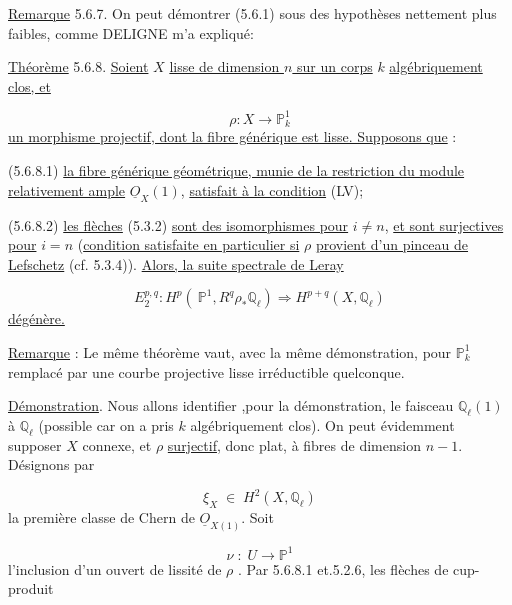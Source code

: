 \underline{Remarque} 5.6.7. On peut démontrer (5.6.1) sous des hypothèses nettement plus faibles, comme DELIGNE m'a expliqué:

\underline{Théorème} 5.6.8. \underline{Soient} $X$ \underline{lisse de dimension $n$ sur un corps} $k$ \underline{algébriquement clos, et}

\begin{equation*}
\rho : X \longrightarrow \mathbb{P}^1_k
\end{equation*}
\underline{un morphisme projectif, dont la fibre générique est lisse. Supposons que} :

(5.6.8.1) \underline{la fibre générique géométrique, munie de la restriction du module relativement ample} $\underline{O}_X(1)$, \underline{satisfait à la condition} (LV);

(5.6.8.2) \underline{les flèches} (5.3.2) \underline{sont des isomorphismes pour} $i \neq n$, \underline{et sont surjectives pour} $i = n$ (\underline{condition satisfaite en particulier si} $\rho$ \underline{provient d'un pinceau de Lefschetz} (cf. 5.3.4)). \underline{Alors, la suite spectrale de Leray}

\begin{equation*}
E_2^{p,q} : H^p(\ \mathbb{P}^1,R^q\rho_*\mathbb{Q}_{\ell}) \Longrightarrow H^{p+q}(X,\mathbb{Q}_{\ell})
\end{equation*}
\underline{dégénère.}

\underline{Remarque} : Le même théorème vaut, avec la même démonstration, pour $\mathbb{P}^1_k$ remplacé par une courbe projective lisse irréductible quelconque.



\underline{Démonstration}. Nous allons identifier ,pour la démonstration, le faisceau $\mathbb{Q}_\ell(1)$ à $\mathbb{Q}_\ell$ (possible car on a pris $k$ algébriquement clos). On peut évidemment supposer $X$ connexe, et $\rho$ \underline{surjectif}, donc plat, à fibres de dimension $n-1$. Désignons par

\begin{equation*}
\xi_X \; \in \; H^2(X,\mathbb{Q}_\ell)
\end{equation*}
la première classe de Chern de $\underline{O}_{X(1)}$. Soit

\begin{equation*}
\nu \; : \; U \longrightarrow \mathbb{P}^1
\end{equation*}
l'inclusion d'un ouvert de lissité de $\rho$ . Par 5.6.8.1 et.5.2.6, les flèches de cup-produit

